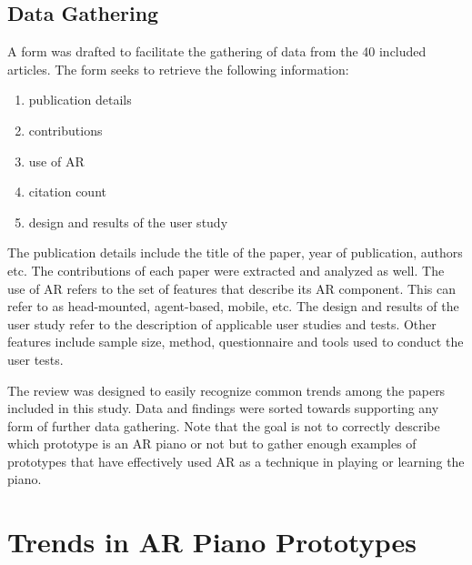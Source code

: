 \documentclass[manuscript,screen]{acmart}
\begin{document}
\subsection{Data Gathering}
\label{subsec: gathering}
A form was drafted to facilitate the gathering of data from the 40 included articles. The form seeks to retrieve the following information: 
\begin{enumerate}
    \item publication details
    \item contributions
    \item use of AR
    \item citation count
    \item design and results of the user study
\end{enumerate}
The publication details include the title of the paper, year of publication, authors etc. The contributions of each paper were extracted and analyzed as well. The use of AR refers to the set of features that describe its AR component. This can refer to as head-mounted, agent-based, mobile, etc. The design and results of the user study refer to the description of applicable user studies and tests. Other features include sample size, method, questionnaire and tools used to conduct the user tests.

The review was designed to easily recognize common trends among the papers included in this study. Data and findings were sorted towards supporting any form of further data gathering. Note that the goal is not to correctly describe which prototype is an AR piano or not but to gather enough examples of prototypes that have effectively used AR as a technique in playing or learning the piano.  

\section{Trends in AR Piano Prototypes}
\end{document}
